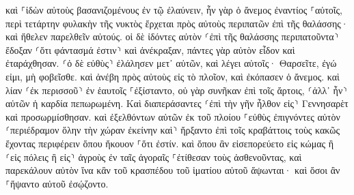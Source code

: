 \documentclass[twoside, 9pt]{extreport}
\begin{document}
καὶ ⸀ἰδὼν αὐτοὺς βασανιζομένους ἐν τῷ ἐλαύνειν, ἦν γὰρ ὁ ἄνεμος ἐναντίος ⸀αὐτοῖς, περὶ τετάρτην φυλακὴν τῆς νυκτὸς ἔρχεται πρὸς αὐτοὺς περιπατῶν ἐπὶ τῆς θαλάσσης· καὶ ἤθελεν παρελθεῖν αὐτούς. 
οἱ δὲ ἰδόντες αὐτὸν ⸂ἐπὶ τῆς θαλάσσης περιπατοῦντα⸃ ἔδοξαν ⸂ὅτι φάντασμά ἐστιν⸃ καὶ ἀνέκραξαν, 
πάντες γὰρ αὐτὸν εἶδον καὶ ἐταράχθησαν. ⸂ὁ δὲ εὐθὺς⸃ ἐλάλησεν μετ᾽ αὐτῶν, καὶ λέγει αὐτοῖς· Θαρσεῖτε, ἐγώ εἰμι, μὴ φοβεῖσθε. 
καὶ ἀνέβη πρὸς αὐτοὺς εἰς τὸ πλοῖον, καὶ ἐκόπασεν ὁ ἄνεμος. καὶ λίαν ⸂ἐκ περισσοῦ⸃ ἐν ἑαυτοῖς ⸀ἐξίσταντο, 
οὐ γὰρ συνῆκαν ἐπὶ τοῖς ἄρτοις, ⸂ἀλλ᾽ ἦν⸃ αὐτῶν ἡ καρδία πεπωρωμένη. 
Καὶ διαπεράσαντες ⸂ἐπὶ τὴν γῆν ἦλθον εἰς⸃ Γεννησαρὲτ καὶ προσωρμίσθησαν. 
καὶ ἐξελθόντων αὐτῶν ἐκ τοῦ πλοίου ⸀εὐθὺς ἐπιγνόντες αὐτὸν 
⸂περιέδραμον ὅλην τὴν χώραν ἐκείνην καὶ⸃ ἤρξαντο ἐπὶ τοῖς κραβάττοις τοὺς κακῶς ἔχοντας περιφέρειν ὅπου ἤκουον ⸀ὅτι ἐστίν. 
καὶ ὅπου ἂν εἰσεπορεύετο εἰς κώμας ἢ ⸂εἰς πόλεις ἢ εἰς⸃ ἀγροὺς ἐν ταῖς ἀγοραῖς ⸀ἐτίθεσαν τοὺς ἀσθενοῦντας, καὶ παρεκάλουν αὐτὸν ἵνα κἂν τοῦ κρασπέδου τοῦ ἱματίου αὐτοῦ ἅψωνται· καὶ ὅσοι ἂν ⸀ἥψαντο αὐτοῦ ἐσῴζοντο. 
\end{document}
